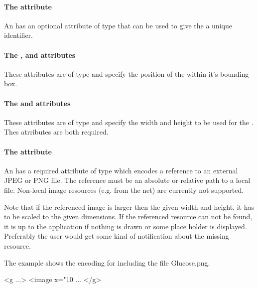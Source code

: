 \paragraph{The \fixttspace{} attribute}

An \Image has an optional attribute  of type  that can be used to give the \Image a unique identifier.

\paragraph{The \fixttspace{}, \fixttspace{} and \fixttspace{}  attributes}

These attributes are of type
\RelAbsVector and specify the position of the \Image within it's bounding box.

\paragraph{The \fixttspace{} and  attributes}

These attributes are of type
\RelAbsVector and specify the width and height to be used for the \Image. Thes atrributes are both required.

\paragraph{The \fixttspace{} attribute}

An \Image has a required attribute  of type
 which encodes a reference to an external JPEG or PNG file. The reference must be an absolute or relative path to a local file.
Non-local image resources (e.g. from the net) are currently not supported.


Note that if the referenced image is larger then the given 
width and height, it has to be scaled to the given dimensions.
If the referenced resource can not be found, it is up to the application if nothing is drawn or some place holder is displayed.
Preferably the user would get some kind of notification about the missing resource.

The example shows the encoding for including the file Glucose.png.
{
\footnotesize
\begin{example}
 <g ...>
  <image x="10%
      ...
</g> 
\end{example}
}


